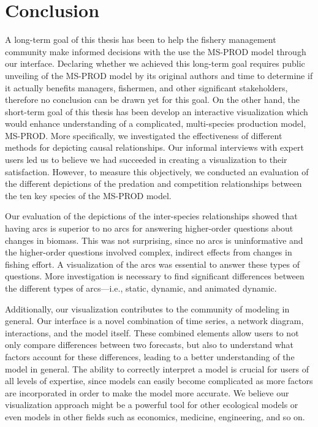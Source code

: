\chapter{Conclusion}

A long-term goal of this thesis has been to help the fishery management community make informed decisions with the use the MS-PROD model through our interface.  Declaring whether we achieved this long-term goal requires public unveiling of the MS-PROD model by its original authors and time to determine if it actually benefits managers, fishermen, and other significant stakeholders, therefore no conclusion can be drawn yet for this goal.  On the other hand, the short-term goal of this thesis has been develop an interactive visualization which would enhance understanding of a complicated, multi-species production model, MS-PROD.  More specifically, we investigated the effectiveness of different methods for depicting causal relationships.  Our informal interviews with expert users led us to believe we had succeeded in creating a visualization to their satisfaction.  However, to measure this objectively, we conducted an evaluation of the different depictions of the predation and competition relationships between the ten key species of the MS-PROD model.

Our evaluation of the depictions of the inter-species relationships showed that having arcs is superior to no arcs for answering higher-order questions about changes in biomass.  This was not surprising, since no arcs is uninformative and the higher-order questions involved complex, indirect effects from changes in fishing effort.  A visualization of the arcs was essential to answer these types of questions.  More investigation is necessary to find significant differences between the different types of arcs---i.e., static, dynamic, and animated dynamic. 

Additionally, our visualization contributes to the community of modeling in general.  Our interface is a novel combination of time series, a network diagram, interactions, and the model itself.  These combined elements allow users to not only compare differences between two forecasts, but also to understand what factors account for these differences, leading to a better understanding of the model in general.  The ability to correctly interpret a model is crucial for users of all levels of expertise, since models can easily become complicated as more factors are incorporated in order to make the model more accurate.  We believe our visualization approach might be a powerful tool for other ecological models or even models in other fields such as economics, medicine, engineering, and so on.

